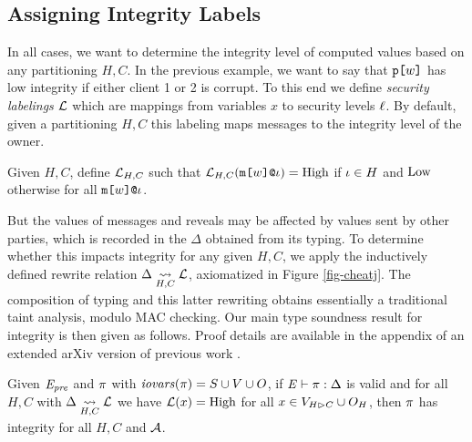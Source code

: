 \cheatjfig

\subsection{Assigning Integrity Labels}

In all cases, we want to determine the integrity level of computed
values based on any partitioning $H,C$. In the previous example,
we want to say that $\texttt{p[}w\texttt{]}$ has low integrity if either client 1 or
2 is corrupt.  To this end we define \emph{security labelings}
$\mathcal{L}$ which are mappings from variables $x$ to security levels
$\ell$. By default, given a partitioning $H,C$ this labeling maps
messages to the integrity level of the owner.
\begin{definition}  
  Given $H,C$,
  define $\mathcal{L}_{H,C}$ such that $\mathcal{L}_{H,C}(\texttt{m[}w\texttt{]}\texttt{@}\iota ) = \mathrm{High}$
  if $\iota \in H$  and $\mathrm{Low}$
  otherwise for all $\texttt{m[}w\texttt{]}\texttt{@}\iota$.
\end{definition}
But the values of messages and reveals may be affected by values sent
by other parties, which is recorded in the $\Delta$ obtained from its
typing. To determine whether this impacts integrity for any given
$H,C$, we apply the inductively defined rewrite relation
$\Delta \underset{H,C}{\leadsto} \mathcal{L}$, axiomatized in Figure
\ref{fig-cheatj}. The composition of typing and this latter rewriting
obtains essentially a traditional taint analysis, modulo MAC checking.
Our main type soundness result for integrity is then given as follows.
Proof details are available in the appendix of an extended arXiv
version of previous work \cite{skalka-near-esop25-arxiv}.
\begin{theorem}
  \label{theorem-ipj}
  Given  $\mathit{E}_{\mathit{pre}}$ and $\pi$ with
  $\mathit{iovars}(\pi) = S \cup V \cup O$, if
  $\mathit{E} \vdash \pi : \Delta$ is valid
  and for all $H,C$ with $\Delta \underset{H,C}{\leadsto} \mathcal{L}$ 
  we have $\mathcal{L}(x) = \mathrm{High}$ for all $x \in V_{H \rhd C} \cup O_H$, then $\pi$
  has integrity for all $H,C$ and $\mathcal{A}$.
\end{theorem}
